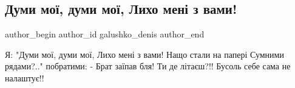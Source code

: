  
 
 
 
 

\subsection{Думи мої, думи мої, Лихо мені з вами!}
\label{sec:03_01_2023.fb.galushko_denis.1.dumi_mo___dumi_mo___}

\ifcmt
 author_begin
   author_id galushko_denis
 author_end
\fi

\obeycr
Я:
"Думи мої, думи мої,
Лихо мені з вами!
Нащо стали на папері
Сумними рядами?.."
побратими:
- Брат заїпав бля! Ти де літаєш?!!  Бусоль себе сама не налаштує!!
\restorecr
